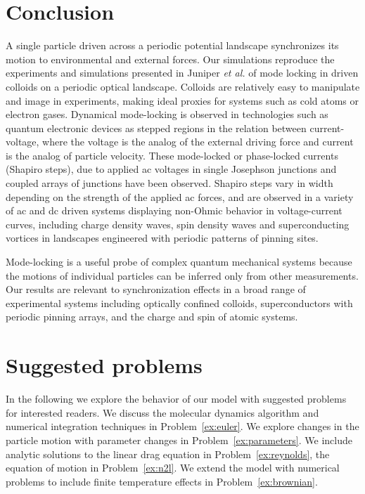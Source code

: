\documentclass[preprint,showpacs,preprintnumbers,amsmath,amssymb,aps,prb]{revtex4-1}
\theoremstyle{remark}
\begin{document}
\section{Conclusion}
\label{sec:conclusion}	
A single particle driven across a periodic potential landscape 
synchronizes its motion 
to environmental and external forces.  
Our simulations reproduce the experiments and simulations presented in 
Juniper {\it et al.} \cite{Juniper2015, Juniper2017}
of 
mode locking in
driven colloids on a
periodic optical landscape.
Colloids are 
relatively easy to 
manipulate and image in experiments,
making ideal proxies 
for systems 
such as cold atoms or electron gases.\cite{Grier2003}
Dynamical mode-locking 
is 
observed in  technologies such as 
 quantum electronic
devices as 
stepped regions in the relation between current-voltage,
where the voltage is the analog of the external driving force
and current is the analog of particle velocity.
These mode-locked or phase-locked currents (Shapiro steps), 
due to applied ac voltages in 
single Josephson junctions\cite{Shapiro1963, Golubov2004} and
coupled arrays of junctions have been observed.\cite{Benz1990}
Shapiro steps vary in width depending on the strength of the
applied ac forces,
and are observed in a variety of ac and dc driven systems
displaying
non-Ohmic behavior in voltage-current curves,
including
charge density waves, spin density waves
and superconducting vortices in landscapes 
engineered with periodic patterns of pinning sites.\cite{Reichhardt2000}

Mode-locking is a useful probe 
of complex quantum mechanical systems
because the motions of individual particles can  be inferred only
from other measurements.
Our results are relevant 
to synchronization effects
in a broad range of experimental systems
including optically confined colloids,
superconductors with periodic pinning arrays, 
and the charge and spin of atomic systems.

\section{Suggested problems}
\label{sec:problems}	

In the following
we explore the behavior of our model
with suggested problems for interested readers.
We discuss the molecular dynamics algorithm
and
numerical integration techniques in Problem~\ref{ex:euler}.
We explore changes in the particle motion
with parameter changes in Problem~\ref{ex:parameters}.
We include analytic solutions to  the 
linear drag equation in Problem~\ref{ex:reynolds}, 
the equation of motion in Problem~\ref{ex:n2l}.
We extend the model with
numerical problems 
to include finite temperature effects
in Problem~\ref{ex:brownian}.
\end{document}
